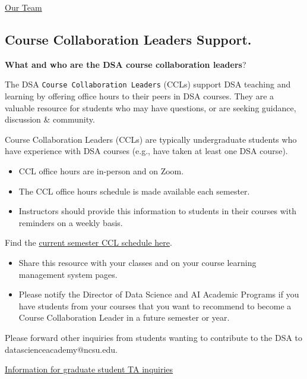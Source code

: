 \documentclass[
  letterpaper,
  DIV=11,
  numbers=noendperiod]{scrreprt}
\providecommand{\tightlist}{%
  \setlength{\itemsep}{0pt}\setlength{\parskip}{0pt}}
\begin{document}
\href{https://datascienceacademy.ncsu.edu/about/our-team/}{Our Team}

\subsection{Course Collaboration Leaders
Support.}\label{course-collaboration-leaders-support.}

\textbf{What and who are the DSA course collaboration leaders}?

The DSA \texttt{Course\ Collaboration\ Leaders} (CCLs) support DSA
teaching and learning by offering office hours to their peers in DSA
courses. They are a valuable resource for students who may have
questions, or are seeking guidance, discussion \& community.

Course Collaboration Leaders (CCLs) are typically undergraduate students
who have experience with DSA courses (e.g., have taken at least one DSA
course).

\begin{itemize}
\tightlist
\item
  CCL office hours are in-person and on Zoom.
\item
  The CCL office hours schedule is made available each semester.
\item
  Instructors should provide this information to students in their
  courses with reminders on a weekly basis.
\end{itemize}

Find the
\href{https://datascienceacademy.ncsu.edu/courses/course-collaboration-leaders/}{current
semester CCL schedule here}.

\begin{itemize}
\item
  Share this resource with your classes and on your course learning
  management system pages.
\item
  Please notify the Director of Data Science and AI Academic Programs if
  you have students from your courses that you want to recommend to
  become a Course Collaboration Leader in a future semester or year.
\end{itemize}

Please forward other inquiries from students wanting to contribute to
the DSA to datascienceacademy@ncsu.edu.

\href{https://docs.google.com/document/d/1VPfx_Ib2ToiO3eP1ipACCrsnoFTWcJNVhCXyESGf5PY/edit?usp=sharing}{Information
for graduate student TA inquiries}

\end{document}
